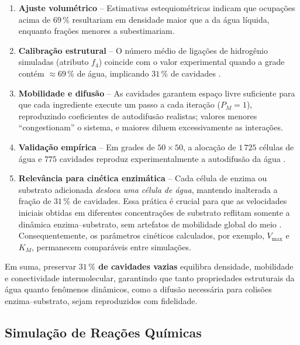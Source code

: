 \documentclass[12pt,oneside]{report}
\begin{document}
\begin{enumerate}[label=\alph*]
    \item \textbf{Ajuste volumétrico} – Estimativas estequiométricas indicam que
          ocupações acima de $69\,\%$ resultariam em densidade maior que a da
          água líquida, enquanto frações menores a subestimariam.

    \item \textbf{Calibração estrutural} – O número médio de ligações de
          hidrogênio simuladas (atributo $f_4$) coincide com o valor experimental
          quando a grade contém $\approx69\,\%$ de água, implicando
          $31\,\%$ de cavidades \cite{kier2005}.

    \item \textbf{Mobilidade e difusão} – As cavidades garantem espaço livre
          suficiente para que cada ingrediente execute um passo a cada iteração
          ($P_M=1$), reproduzindo coeficientes de autodifusão realistas; valores
          menores ``congestionam'' o sistema, e maiores diluem excessivamente as
          interações.

    \item \textbf{Validação empírica} – Em grades de $50\times50$, a alocação de
          $1\,725$ células de água e $775$ cavidades reproduz experimentalmente a autodifusão da água \cite{kier2005}.

    \item \textbf{Relevância para cinética enzimática} – Cada célula de
          enzima ou substrato adicionada \emph{desloca uma célula de água},
          mantendo inalterada a fração de $31\,\%$ de cavidades.  Essa prática é
          crucial para que as velocidades iniciais obtidas em diferentes
          concentrações de substrato reflitam somente a dinâmica
          enzima--substrato, sem artefatos de mobilidade global do meio
          \cite{kier2005}.  Consequentemente, os parâmetros cinéticos
          calculados, por exemplo, $V_{\max}$ e $K_M$,
          permanecem comparáveis entre simulações.
\end{enumerate}

Em suma, preservar \textbf{$31\,\%$ de cavidades vazias} equilibra densidade,
mobilidade e conectividade intermolecular, garantindo que tanto propriedades
estruturais da água quanto fenômenos dinâmicos, como a difusão necessária
para colisões enzima--substrato, sejam reproduzidos com fidelidade.

\subsection{Simulação de Reações Químicas}
\end{document}

